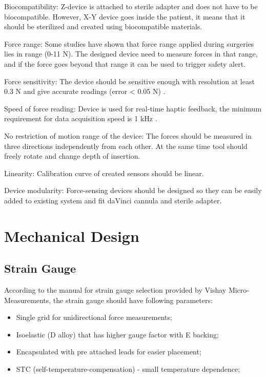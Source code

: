 	Biocompatibility: Z-device is attached to sterile adapter and does not have to be biocompatible. However, X-Y device goes inside the patient, it means that it should be sterilized and created using biocompatible materials.
	
	Force range: Some studies \cite{mack_interactive_2012, prasad_modular_2003, } have shown that force range applied during surgeries lies in range (0-11 N). The designed device need to measure forces in that range, and if the force goes beyond that range it can be used to trigger safety alert.
	
	Force sensitivity: The device should be sensitive enough with resolution at least 0.3 N and give accurate readings (error < 0.05 N) \cite{mack_interactive_2012}.
	
	Speed of force reading: Device is used for real-time haptic feedback, the minimum requirement for data acquisition speed is 1 kHz \cite{seungmoon_choi_effect_2004}.
	
	No restriction of motion range of the device: The forces should be measured  in three directions independently from each other. At the same time tool should freely rotate and change depth of insertion.	
	
	Linearity: Calibration curve of created sensors should be linear.

	Device modularity: Force-sensing devices should be designed so they can be easily added to existing system and fit daVinci cannula and sterile adapter.
	
\section{Mechanical Design}
\label{sec:mechDes}

	\subsection{Strain Gauge}
	\label{sec:SGReq}
	According to the manual for strain gauge selection provided by Vishay Micro-Measurements, the strain gauge should have following parameters:
\begin{itemize}
  \item Single grid for unidirectional force measurements;
  \item Isoelastic (D alloy) that has higher gauge factor with E backing;
  \item Encapsulated with pre attached leads for easier placement;
  \item STC (self-temperature-compensation) - small temperature dependence;
\end{itemize}	
	
